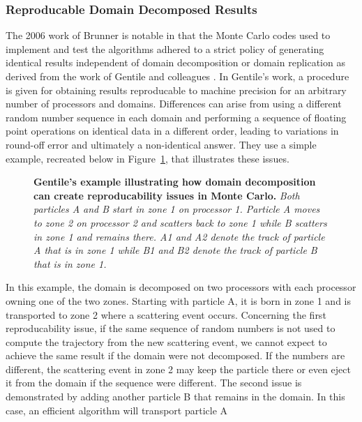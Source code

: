 \subsubsection{Reproducable Domain Decomposed Results}
\label{subsubsec:reproducable_mc}
The 2006 work of Brunner is notable in that the Monte Carlo codes used
to implement and test the algorithms adhered to a strict policy of
generating identical results independent of domain decomposition or
domain replication as derived from the work of Gentile and colleagues
\citep{gentile_obtaining_2005}. In Gentile's work, a procedure is
given for obtaining results reproducable to machine precision for an
arbitrary number of processors and domains. Differences can arise from
using a different random number sequence in each domain and performing
a sequence of floating point operations on identical data in a
different order, leading to variations in round-off error and
ultimately a non-identical answer. They use a simple example,
recreated below in Figure~\ref{fig:gentile_example}, that illustrates
these issues.
\begin{figure}[htpb!]
  \begin{center}
    \scalebox{1.5}{
       }
  \end{center}
  \caption{\textbf{Gentile's example illustrating how domain
      decomposition can create reproducability issues in Monte Carlo.}
    \textit{Both particles A and B start in zone 1 on processor
      1. Particle A moves to zone 2 on processor 2 and scatters back
      to zone 1 while B scatters in zone 1 and remains there. A1 and
      A2 denote the track of particle A that is in zone 1 while B1 and
      B2 denote the track of particle B that is in zone 1.}}
  \label{fig:gentile_example}
\end{figure}
In this example, the domain is decomposed on two processors with each
processor owning one of the two zones. Starting with particle A, it is
born in zone 1 and is transported to zone 2 where a scattering event
occurs. Concerning the first reproducability issue, if the same
sequence of random numbers is not used to compute the trajectory from
the new scattering event, we cannot expect to achieve the same result
if the domain were not decomposed. If the numbers are different, the
scattering event in zone 2 may keep the particle there or even eject
it from the domain if the sequence were different. The second issue is
demonstrated by adding another particle B that remains in the
domain. In this case, an efficient algorithm will transport particle A
